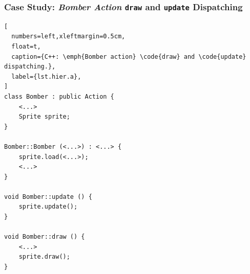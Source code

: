 \documentclass[10pt, conference, compsocconf]{IEEEtran}
\newcommand{\code}[1] {{\small{\texttt{#1}}}}
\newcommand{\Code}[1] {{\texttt{#1}}}
\begin{document}
\subsubsection{Case Study: \emph{Bomber Action} \Code{draw} and \Code{update} Dispatching}

\begin{lstlisting}[
  numbers=left,xleftmargin=0.5cm,
  float=t,
  caption={C++: \emph{Bomber action} \code{draw} and \code{update} dispatching.},
  label={lst.hier.a},
]
class Bomber : public Action {
    <...>
    Sprite sprite;
}

Bomber::Bomber (<...>) : <...> {
    sprite.load(<...>);
    <...>
}

void Bomber::update () {
    sprite.update();
}

void Bomber::draw () {
    <...>
    sprite.draw();
}
\end{lstlisting}
\end{document}
